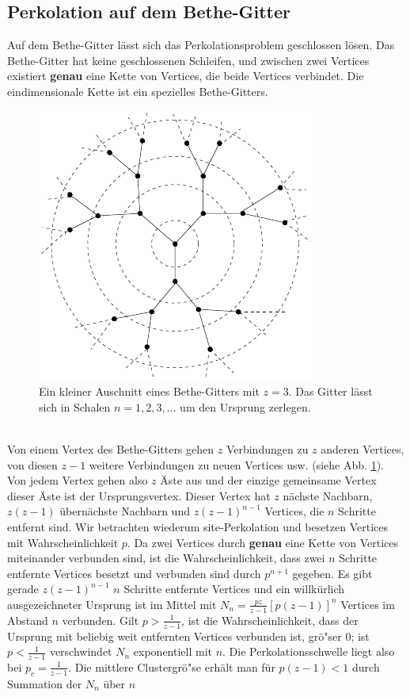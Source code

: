 \subsection{Perkolation auf dem Bethe-Gitter}
Auf dem Bethe-Gitter l\"asst sich das Perkolationsproblem geschlossen l\"osen. Das Bethe-Gitter hat keine geschlossenen Schleifen, und zwischen zwei Vertices existiert \textbf{genau} eine Kette von Vertices, die beide Vertices verbindet. Die eindimensionale Kette ist ein spezielles Bethe-Gitters.
\begin{figure}[tbp]
  \centering
  \includegraphics{./Einleitung-figs/bethe}
  \caption{Ein kleiner Auschnitt eines Bethe-Gitters mit $z=3$. Das Gitter l\"asst sich in Schalen $n=1,2,3,\ldots$ um den Ursprung zerlegen. }
  \label{fig:caley}
\end{figure}
\\Von einem Vertex des Bethe-Gitters gehen $z$ Verbindungen zu $z$ anderen Vertices, von diesen $z-1$ weitere Verbindungen zu neuen Vertices usw. (siehe Abb. \ref{fig:caley}). Von jedem Vertex gehen also $z$ \"Aste aus und der einzige gemeinsame Vertex dieser \"Aste ist der Ursprungsvertex. Dieser Vertex hat $z$ n\"achste Nachbarn, $z(z-1)$ \"ubern\"achste Nachbarn und $z(z-1)^{n-1}$ Vertices, die $n$ Schritte entfernt sind. Wir betrachten wiederum site-Perkolation und besetzen Vertices mit Wahrscheinlichkeit $p$.  Da zwei Vertices durch \textbf{genau} eine Kette von Vertices miteinander verbunden sind, ist die Wahrscheinlichkeit, dass zwei $n$ Schritte entfernte Vertices besetzt und verbunden sind durch $p^{n+1}$ gegeben. Es gibt gerade $z(z-1)^{n-1}$ $n$ Schritte entfernte Vertices und ein willk\"urlich ausgezeichneter Ursprung ist im Mittel mit $N_n=\frac{pz}{z-1}[p(z-1)]^n$ Vertices im Abstand $n$ verbunden. Gilt $p>\frac{1}{z-1}$, ist die Wahrscheinlichkeit, dass der Ursprung mit beliebig weit entfernten Vertices verbunden ist, gr\"o"ser $0$; ist $p<\frac{1}{z-1}$ verschwindet $N_n$ exponentiell mit $n$. Die Perkolationsschwelle liegt also bei $p_c=\frac{1}{z-1}$. Die mittlere Clustergr\"o"se erh\"alt man f\"ur $p(z-1)<1$ durch Summation der $N_n$ \"uber $n$
